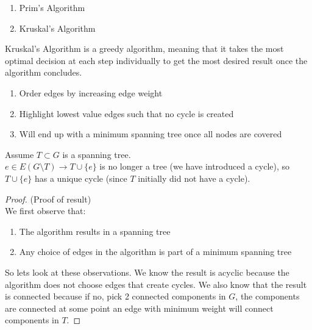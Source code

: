 \documentclass[12pt]{article}
\begin{document}
\begin{enumerate}
	\item{Prim's Algorithm}
	\item{Kruskal's Algorithm}
\end{enumerate}

\begin{tcolorbox}[title=Kruskal's Algorithm]
	Kruskal's Algorithm is a greedy algorithm, meaning that it takes the most optimal decision at each step individually to get the most desired result once the algorithm concludes.
	\begin{enumerate}
		\item{Order edges by increasing edge weight}
		\item{Highlight lowest value edges such that no cycle is created}
		\item{Will end up with a minimum spanning tree once all nodes are covered}
	\end{enumerate}
\end{tcolorbox}

Assume $T \subset G$ is a spanning tree.\\
$e \in E(G \setminus T) \longrightarrow T \cup \{ e \}$ is no longer a tree (we have introduced a cycle), so $T \cup \{ e \}$ has a unique cycle (since $T$ initially did not have a cycle).

\begin{proof}
	(Proof of result)\\
	We first observe that:\\
	\begin{enumerate}
		\item{The algorithm results in a spanning tree}
		\item{Any choice of edges in the algorithm is part of a minimum spanning tree}
	\end{enumerate}
So lets look at these observations. We know the result is acyclic because the algorithm does not choose edges that create cycles. We also know that the result is connected because if no, pick 2 connected components in $G$, the components are connected at some point an edge with minimum weight will connect components in $T$.
\end{proof}

\newpage
\end{document}
